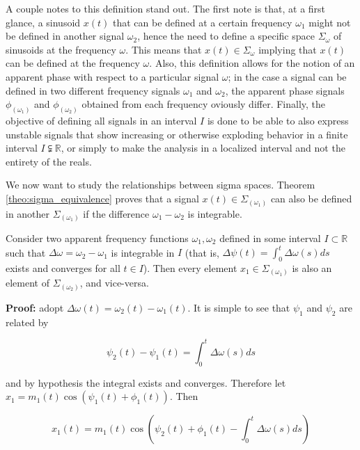 	A couple notes to this definition stand out. The first note is that, at a first glance, a sinusoid $x(t)$ that can be defined at a certain frequency $\omega_1$ might not be defined in another signal $\omega_2$, hence the need to define a specific space $\Sigma_\omega$ of sinusoids at the frequency $\omega$. This means that $x(t)\in\Sigma_\omega$ implying that $x(t)$ can be defined at the frequency $\omega$. Also, this definition allows for the notion of an apparent phase with respect to a particular signal $\omega$; in the case a signal can be defined in two different frequency signals $\omega_1$ and $\omega_2$, the apparent phase signals $\phi_{\left(\omega_1\right)}$ and $\phi_{\left(\omega_2\right)}$ obtained from each frequency oviously differ. Finally, the objective of defining all signals in an interval $I$ is done to be able to also express unstable signals that show increasing or otherwise exploding behavior in a finite interval $I\subsetneqq \mathbb{R}$, or simply to make the analysis in a localized interval and not the entirety of the reals.

	We now want to study the relationships between sigma spaces. Theorem \ref{theo:sigma_equivalence} proves that a signal $x(t)\in\Sigma_{\left(\omega_1\right)}$ can also be defined in another $\Sigma_{\left(\omega_1\right)}$ if the difference $\omega_1 - \omega_2$ is integrable.

\begin{theorem}\label{theo:sigma_equivalence} %
	Consider two apparent frequency functions $\omega_1,\omega_2$ defined in some interval $I\subset \mathbb{R}$ such that $\Delta\omega = \omega_2 - \omega_1$ is integrable in $I$ (that is, $\Delta\psi (t) = \int_0^t \Delta\omega(s)ds$ exists and converges for all $t\in I$). Then every element $x_1\in\Sigma_{\left(\omega_1\right)}$ is also an element of $\Sigma_{\left(\omega_2\right)}$, and vice-versa. \end{theorem}
\textbf{Proof:} adopt $\Delta\omega(t) = \omega_2(t) - \omega_1(t)$. It is simple to see that $\psi_1$ and $\psi_2$ are related by

\begin{equation} \psi_2(t) - \psi_1(t) = \int_{0}^t \Delta\omega(s)ds \end{equation}

	and by hypothesis the integral exists and converges. Therefore let $x_1 = m_1(t)\cos\left(\psi_1(t) + \phi_1(t)\right)$. Then

\small\begin{equation} x_1(t) = m_1(t)\cos\left(\psi_2(t) + \phi_1(t) - \int_0^t \Delta\omega(s)ds\right) \end{equation}\normalsize

